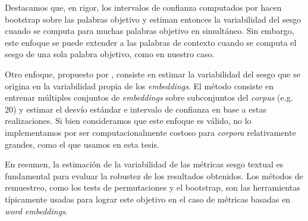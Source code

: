 Destacamos que, en rigor, los intervalos de confianza computados por \citet{garg2018word} hacen bootstrap sobre las palabras objetivo y estiman entonces la variabilidad del sesgo cuando se computa para muchas palabras objetivo en simultáneo. Sin embargo, este enfoque se puede extender a las palabras de contexto cuando se computa el sesgo de una sola palabra objetivo, como en nuestro caso.

Otro enfoque, propuesto por \citet{kozlowski2019geometry}, consiste en estimar la variabilidad del sesgo que se origina en la variabilidad propia de los \emph{embeddings}. El método consiste en entrenar múltiples conjuntos de \emph{embeddings} sobre subconjuntos del \emph{corpus} (e.g. 20) y estimar el desvío estándar e intervalo de confianza en base a estas realizaciones. Si bien consideramos que este enfoque es válido, no lo implementamos por ser computacionalmente costoso para \emph{corpora} relativamente grandes, como el que usamos en esta tesis.

En resumen, la estimación de la variabilidad de las métricas sesgo textual es fundamental para evaluar la robustez de los resultados obtenidos. Los métodos de remuestreo, como los tests de permutaciones y el bootstrap, son las herramientas típicamente usadas para lograr este objetivo en el caso de métricas basadas en \emph{word embeddings}.
